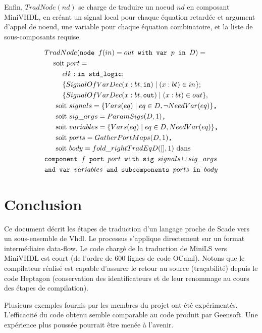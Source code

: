 \documentclass[a4paper]{article}
\newcommand{\LANG}{{\sc Heptagon}}
\newcommand{\scade}{{\sc Scade}}
\newcommand{\minils}{{\sc MiniLS}}
\newcommand{\minivhdl}{{\sc MiniVHDL}}
\newcommand{\vhdl}{{\sc Vhdl}}
\newcommand{\p}[0]{\; \vert \;}
\newcommand{\mybox}[1]{\mbox{\tt{#1}}}
\newcommand{\bl}[0]{\hspace{0.45cm}}
\begin{document}
Enfin, $TradNode(nd)$ se charge de traduire un noeud $nd$ en composant
\minivhdl{}, en créant un signal local pour chaque équation retardée et
argument d'appel de noeud, une variable pour chaque équation combinatoire, et
la liste de sous-composants requise.

\begin{align*}
  & TradNode(\mybox{node } f(in) = out \mybox{ with var } p \mybox{ in } D) = \\
  & \bl \mbox{soit } port = \\
  & \bl \bl clk : \mybox{in std\_logic}; \\
  & \bl \bl \{ SignalOfVarDec(x : bt, \mybox{in}) \p (x : bt) \in in \}; \\
  & \bl \bl \{ SignalOfVarDec(x : bt, \mybox{out}) \p (x : bt) \in out \}, \\
  & \bl \mbox{ soit } signals = \{ \V{eq} \p eq \in D, \neg \NV{eq} \}
  \mybox{,} \\
  & \bl \mbox{ soit } sig\_args = \PS{D}{1} \mybox{,} \\
  & \bl \mbox{ soit } variables = \{ \V{eq} \p eq \in D, \NV{eq} \} \mybox{,} \\
  & \bl \mbox{ soit } ports = \GPM{D}{1} \mybox{,} \\
  & \bl \mbox{ soit } body = fold\_right TradEq D ([], 1) \mbox{ dans} \\
  & \mybox{component } f \mybox{ port } port \mybox{ with sig } signals \cup
  sig\_args \\
  & \mybox{and var } variables \mybox{ and subcomponents } ports \mybox{ in }
  body
\end{align*}

\section{Conclusion}

Ce document décrit les étapes de traduction d'un langage proche de
\scade{} vers un sous-ensemble de \vhdl. Le processus s'applique
directement sur un format intermédiaire data-flow. Le code chargé de la traduction
de \minils{} vers \minivhdl{} est court (de l'ordre de 600 lignes de code OCaml).
Notons que le compilateur réalisé est capable d'assurer le retour au source (tra\c{c}abilité)
depuis le code \LANG{} (conservation des identificateurs et de leur renommage
au cours des étapes de compilation).

Plusieurs exemples fournis par les membres du projet ont été expérimentés. L'efficacité
du code obtenu semble comparable au code produit par Geensoft. Une expérience plus
poussée pourrait être menée à l'avenir. 
\end{document}
